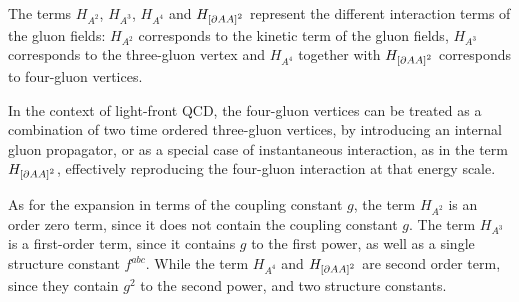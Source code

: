 \documentclass[11pt,a4paper,twoside,pdf]{article}
\numberwithin{equation}{section}
\begin{document}
The terms $H_{A^2}$, $H_{A^3}$, $H_{A^4}$ and $H_{\left[ \partial A A \right]^2}$
represent the different interaction terms of the gluon fields: $H_{A^2}$ corresponds to 
the kinetic term of the gluon fields, $H_{A^3}$ corresponds to the three-gluon
vertex and  $H_{A^4}$ together with $H_{\left[ \partial A A \right]^2}$ corresponds to
four-gluon vertices. 

In the context of light-front QCD, the four-gluon vertices can be treated as a combination of two
time ordered
three-gluon vertices, by introducing an internal gluon propagator, or as a
special case of instantaneous interaction, as in the term $H_{\left[ \partial A A \right]^2}$, 
effectively reproducing the four-gluon interaction at that energy scale. 

As for the expansion in terms of the coupling constant \( g \), the term $H_{A^2}$ is
an order zero term, since it does not contain the coupling constant \( g \).
The term $H_{A^3}$ is a first-order term, since it contains $g$ to the first power,
as well as a single structure constant $f^{abc}$. While the term $H_{A^4}$ and $H_{\left[ \partial A A \right]^2}$
are second order term, since they contain $g^2$ to the second power, and two structure constants.
\end{document}
